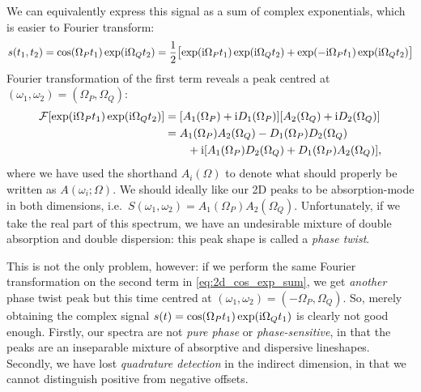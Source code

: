 We can equivalently express this signal as a sum of complex exponentials, which is easier to Fourier transform:
\begin{equation}
    \label{eq:2d_cos_exp_sum}
    s(t_1, t_2) = \cos(\Omega_P t_1)\exp(\mathrm{i} \Omega_Q t_2) = \frac{1}{2}\bigl[\exp(\mathrm{i}\Omega_P t_1)\exp(\mathrm{i}\Omega_Q t_2) + \exp(-\mathrm{i}\Omega_P t_1)\exp(\mathrm{i}\Omega_Q t_2)\bigr]
\end{equation}
Fourier transformation of the first term reveals a peak centred at $(\omega_1, \omega_2) = (\Omega_P, \Omega_Q)$:
\begin{align}
    \label{eq:ft_2d_phasetwist}
    \mathcal{F}[\exp(\mathrm{i}\Omega_P t_1)\exp(\mathrm{i}\Omega_Q t_2)]
        &= [A_1(\Omega_P) + \mathrm{i} D_1(\Omega_P)][A_2(\Omega_Q) + \mathrm{i} D_2(\Omega_Q)] \notag \\
        &= A_1(\Omega_P)A_2(\Omega_Q) - D_1(\Omega_P)D_2(\Omega_Q) \notag \\
        &\quad\quad + \mathrm{i}[A_1(\Omega_P)D_2(\Omega_Q) + D_1(\Omega_P)A_2(\Omega_Q)],
\end{align}
where we have used the shorthand $A_i(\Omega)$ to denote what should properly be written as $A(\omega_i;\Omega)$.
We should ideally like our 2D peaks to be absorption-mode in both dimensions, i.e.\ $S(\omega_1, \omega_2) = A_1(\Omega_P)A_2(\Omega_Q)$.
Unfortunately, if we take the real part of this spectrum, we have an undesirable mixture of double absorption and double dispersion: this peak shape is called a \textit{phase twist}.

This is not the only problem, however: if we perform the same Fourier transformation on the second term in \cref{eq:2d_cos_exp_sum}, we get \textit{another} phase twist peak but this time centred at $(\omega_1, \omega_2) = (-\Omega_P, \Omega_Q)$.
So, merely obtaining the complex signal $s(t) = \cos(\Omega_P t_1)\exp(\mathrm{i}\Omega_Q t_1)$ is clearly not good enough.
Firstly, our spectra are not \textit{pure phase} or \textit{phase-sensitive}, in that the peaks are an inseparable mixture of absorptive and dispersive lineshapes.
Secondly, we have lost \textit{quadrature detection} in the indirect dimension, in that we cannot distinguish positive from negative offsets.

